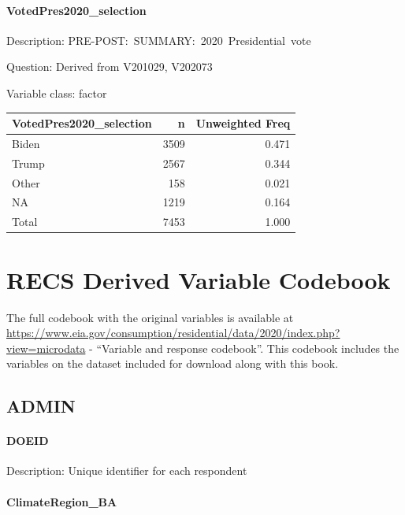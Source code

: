\documentclass[
]{krantz}
\begin{document}
\hypertarget{votedpres2020_selection}{%
\subsubsection*{VotedPres2020\_selection}\label{votedpres2020_selection}}


Description: PRE-POST:~SUMMARY:~2020~Presidential~vote

Question: Derived from V201029, V202073

Variable class: factor

\begin{tabular}[t]{l|r|r}
\hline
VotedPres2020\_selection & n & Unweighted Freq\\
\hline
Biden & 3509 & 0.471\\
\hline
Trump & 2567 & 0.344\\
\hline
Other & 158 & 0.021\\
\hline
NA & 1219 & 0.164\\
\hline
Total & 7453 & 1.000\\
\hline
\end{tabular}

\hypertarget{recs-cb}{%
\chapter{RECS Derived Variable Codebook}\label{recs-cb}}

The full codebook with the original variables is available at \url{https://www.eia.gov/consumption/residential/data/2020/index.php?view=microdata} - ``Variable and response codebook''. This codebook includes the variables on the dataset included for download along with this book.

\hypertarget{admin-1}{%
\section{ADMIN}\label{admin-1}}

\hypertarget{doeid}{%
\subsubsection*{DOEID}\label{doeid}}


Description: Unique identifier for each respondent

\hypertarget{climateregion_ba}{%
\subsubsection*{ClimateRegion\_BA}\label{climateregion_ba}}
\end{document}
